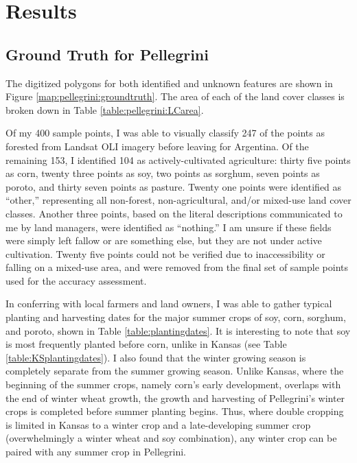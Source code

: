 \chapter{Results}

\section{Ground Truth for Pellegrini}

The digitized polygons for both identified and unknown features are shown in Figure \ref{map:pellegrini:groundtruth}. The area of each of the land cover classes is broken down in Table \ref{table:pellegrini:LCarea}.

Of my 400 sample points, I was able to visually classify 247 of the points as forested from Landsat OLI imagery before leaving for Argentina. Of the remaining 153, I identified 104 as actively-cultivated agriculture: thirty five points as corn, twenty three points as soy, two points as sorghum, seven points as poroto, and thirty seven points as pasture. Twenty one points were identified as ``other,'' representing all non-forest, non-agricultural, and/or mixed-use land cover classes. Another three points, based on the literal descriptions communicated to me by land managers, were identified as ``nothing.'' I am unsure if these fields were simply left fallow or are something else, but they are not under active cultivation. Twenty five points could not be verified due to inaccessibility or falling on a mixed-use area, and were removed from the final set of sample points used for the accuracy assessment.

In conferring with local farmers and land owners, I was able to gather typical planting and harvesting dates for the major summer crops of soy, corn, sorghum, and poroto, shown in Table \ref{table:plantingdates}. It is interesting to note that soy is most frequently planted before corn, unlike in Kansas (see Table \ref{table:KSplantingdates}). I also found that the winter growing season is completely separate from the summer growing season. Unlike Kansas, where the beginning of the summer crops, namely corn's early development, overlaps with the end of winter wheat growth, the growth and harvesting of Pellegrini's winter crops is completed before summer planting begins. Thus, where double cropping is limited in Kansas to a winter crop and a late-developing summer crop (overwhelmingly a winter wheat and soy combination), any winter crop can be paired with any summer crop in Pellegrini.

